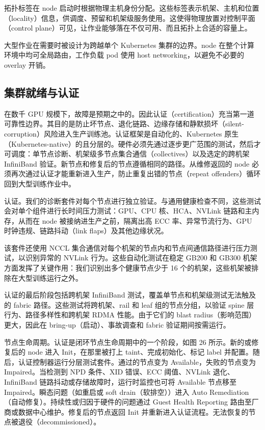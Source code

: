 \documentclass[
  10
]{article}
\begin{document}
拓扑标签在 node 启动时根据物理主机身份分配。这些标签表示机架、主机和位置（locality）信息，供调度、预留和机架级服务使用。这使得物理放置对控制平面（control plane）可见，让作业能够落在不仅可用、而且拓扑上合适的容量上。

大型作业在需要时被设计为跨越单个 Kubernetes 集群的边界。node 在整个计算环境中均可全局路由，工作负载 pod 使用 host networking，以避免不必要的 overlay 开销。

\subsection{集群就绪与认证}\label{l.2-cluster-readiness-and-certification}

在数千 GPU 规模下，故障是预期之中的。因此认证（certification）充当第一道可靠性边界。其目的是防止坏节点、退化链路、边缘存储和静默损坏（silent-corruption）风险进入生产训练池。认证框架是自动化的、Kubernetes 原生（Kubernetes-native）的且分层的。硬件必须先通过逐步更广范围的测试，然后才可调度：单节点诊断、机架级多节点集合通信（collectives）以及选定的跨机架 InfiniBand 验证。新节点和修复后的节点遵循相同的路径。从维修返回的 node 必须再次通过认证才能重新进入生产，防止重复出错的节点（repeat offenders）循环回到大型训练作业中。

认证。我们的诊断套件对每个节点进行独立验证。与通用健康检查不同，这些测试会对单个组件进行长时间压力测试：GPU、CPU 核、HCA、NVLink 链路和主内存，从而在 node 被接纳进生产之前，隔离出高 ECC 率、异常节流行为、GPU 时钟违规、链路抖动（link flaps）及其他边缘状况。

该套件还使用 NCCL 集合通信对每个机架的节点内和节点间通信路径进行压力测试，以识别异常的 NVLink 行为。这些自动化测试在稳定 GB200 和 GB300 机架方面发挥了关键作用：我们识别出多个健康节点少于 16 个的机架，这些机架被排除在大型训练运行之外。

认证的最后阶段包括跨机架 InfiniBand 测试，覆盖单节点和机架级测试无法触及的 fabric 路径。这些测试将跨机架、rail 和 leaf 组的节点分组，以验证 spine 层行为、路径多样性和跨机架 RDMA 性能。由于它们的 blast radius（影响范围）更大，因此在 bring-up（启动）、事故调查和 fabric 验证期间按需运行。

节点生命周期。认证是闭环节点生命周期中的一个阶段，如图 26 所示。新的或修复后的 node 进入 Init，在那里被打上 taint、完成初始化、标记 label 并配置。随后，认证控制器运行分层测试套件。通过的节点变为 Available，失败的节点变为 Impaired。当检测到 NPD 条件、XID 错误、ECC 阈值、NVLink 退化、InfiniBand 链路抖动或存储故障时，运行时监控也可将 Available 节点移至 Impaired。瞬态问题（如重启或 soft drain（软排空））进入 Auto Remediation（自动修复）。持续性或归因于硬件的问题通过 Guest Health Reporting 路由至厂商或数据中心维护。修复后的节点返回 Init 并重新进入认证流程。无法恢复的节点被退役（decommissioned）。
\end{document}
